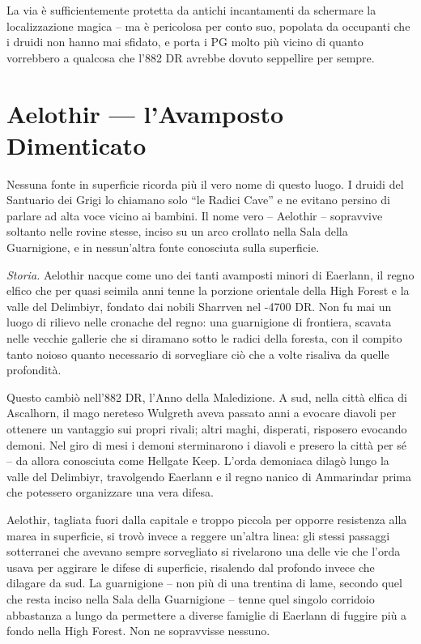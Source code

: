 La via è sufficientemente protetta da antichi incantamenti da schermare la localizzazione magica -- ma è pericolosa per conto suo, popolata da occupanti che i druidi non hanno mai sfidato, e porta i PG molto più vicino di quanto vorrebbero a qualcosa che l'882 DR avrebbe dovuto seppellire per sempre.

\section{Aelothir --- l'Avamposto Dimenticato}

Nessuna fonte in superficie ricorda più il vero nome di questo luogo. I druidi del Santuario dei Grigi lo chiamano solo ``le Radici Cave'' e ne evitano persino di parlare ad alta voce vicino ai bambini. Il nome vero -- Aelothir -- sopravvive soltanto nelle rovine stesse, inciso su un arco crollato nella Sala della Guarnigione, e in nessun'altra fonte conosciuta sulla superficie.

\textit{Storia.} Aelothir nacque come uno dei tanti avamposti minori di Eaerlann, il regno elfico che per quasi seimila anni tenne la porzione orientale della High Forest e la valle del Delimbiyr, fondato dai nobili Sharrven nel -4700 DR. Non fu mai un luogo di rilievo nelle cronache del regno: una guarnigione di frontiera, scavata nelle vecchie gallerie che si diramano sotto le radici della foresta, con il compito tanto noioso quanto necessario di sorvegliare ciò che a volte risaliva da quelle profondità.

Questo cambiò nell'882 DR, l'Anno della Maledizione. A sud, nella città elfica di Ascalhorn, il mago nereteso Wulgreth aveva passato anni a evocare diavoli per ottenere un vantaggio sui propri rivali; altri maghi, disperati, risposero evocando demoni. Nel giro di mesi i demoni sterminarono i diavoli e presero la città per sé -- da allora conosciuta come Hellgate Keep. L'orda demoniaca dilagò lungo la valle del Delimbiyr, travolgendo Eaerlann e il regno nanico di Ammarindar prima che potessero organizzare una vera difesa.

Aelothir, tagliata fuori dalla capitale e troppo piccola per opporre resistenza alla marea in superficie, si trovò invece a reggere un'altra linea: gli stessi passaggi sotterranei che avevano sempre sorvegliato si rivelarono una delle vie che l'orda usava per aggirare le difese di superficie, risalendo dal profondo invece che dilagare da sud. La guarnigione -- non più di una trentina di lame, secondo quel che resta inciso nella Sala della Guarnigione -- tenne quel singolo corridoio abbastanza a lungo da permettere a diverse famiglie di Eaerlann di fuggire più a fondo nella High Forest. Non ne sopravvisse nessuno.

